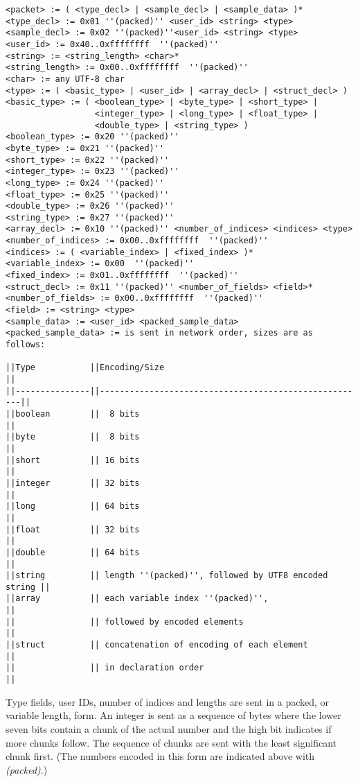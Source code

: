 \documentclass[a4paper]{article}
\begin{document}
\begin{verbatim}
<packet> := ( <type_decl> | <sample_decl> | <sample_data> )*
<type_decl> := 0x01 ''(packed)'' <user_id> <string> <type>
<sample_decl> := 0x02 ''(packed)''<user_id> <string> <type>
<user_id> := 0x40..0xffffffff  ''(packed)''
<string> := <string_length> <char>*
<string_length> := 0x00..0xffffffff  ''(packed)''
<char> := any UTF-8 char
<type> := ( <basic_type> | <user_id> | <array_decl> | <struct_decl> )
<basic_type> := ( <boolean_type> | <byte_type> | <short_type> |
                  <integer_type> | <long_type> | <float_type> |
                  <double_type> | <string_type> )
<boolean_type> := 0x20 ''(packed)''
<byte_type> := 0x21 ''(packed)''
<short_type> := 0x22 ''(packed)''
<integer_type> := 0x23 ''(packed)''
<long_type> := 0x24 ''(packed)''
<float_type> := 0x25 ''(packed)''
<double_type> := 0x26 ''(packed)''
<string_type> := 0x27 ''(packed)''
<array_decl> := 0x10 ''(packed)'' <number_of_indices> <indices> <type>
<number_of_indices> := 0x00..0xffffffff  ''(packed)''
<indices> := ( <variable_index> | <fixed_index> )*
<variable_index> := 0x00  ''(packed)''
<fixed_index> := 0x01..0xffffffff  ''(packed)''
<struct_decl> := 0x11 ''(packed)'' <number_of_fields> <field>*
<number_of_fields> := 0x00..0xffffffff  ''(packed)''
<field> := <string> <type>
<sample_data> := <user_id> <packed_sample_data>
<packed_sample_data> := is sent in network order, sizes are as follows:

||Type           ||Encoding/Size                                         ||
||---------------||------------------------------------------------------||
||boolean        ||  8 bits                                              ||
||byte           ||  8 bits                                              ||
||short          || 16 bits                                              ||
||integer        || 32 bits                                              ||
||long           || 64 bits                                              ||
||float          || 32 bits                                              ||
||double         || 64 bits                                              ||
||string         || length ''(packed)'', followed by UTF8 encoded string ||
||array          || each variable index ''(packed)'',                    ||
||               || followed by encoded elements                         ||
||struct         || concatenation of encoding of each element            ||
||               || in declaration order                                 ||
\end{verbatim}

Type fields, user IDs, number of indices and lengths are sent in a packed, or
variable length, form.  An integer is sent as a sequence of bytes where the
lower seven bits contain a chunk of the actual number and the high bit
indicates if more chunks follow. The sequence of chunks are sent with the least
significant chunk first.  (The numbers encoded in this form are indicated above
with \textit{(packed)}.)
\end{document}
